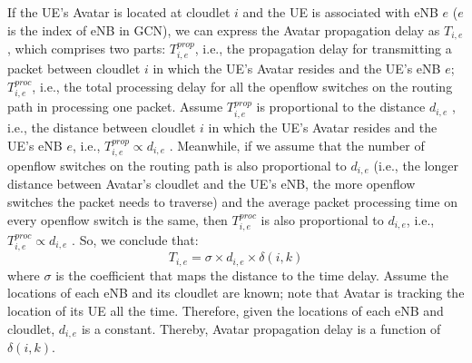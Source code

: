 \documentclass[journal,12pt,draftclsnofoot,onecolumn]{IEEEtran}
\begin{document}
	If the UE's Avatar is located at cloudlet $i$ and the UE is associated with eNB $e$ ($e$ is the index of eNB in GCN), we can express the Avatar propagation delay as $T_{i,e}$, which comprises two parts: $T_{i,e}^{prop}$, i.e., the propagation delay for transmitting a packet between cloudlet $i$ in which the UE's Avatar resides and the UE's eNB $e$; $T_{i,e}^{proc}$, i.e., the total processing delay for all the openflow switches on the routing path in processing one packet. Assume $T_{i,e}^{prop}$ is proportional to the distance $d_{i,e}$ \cite{20}, i.e., the distance between cloudlet $i$ in which the UE's Avatar resides and the UE's eNB $e$, i.e., $T_{i,e}^{prop}\propto {{d}_{i,e}}$ . Meanwhile, if we assume that the number of openflow switches on the routing path is also proportional to $d_{i,e}$ (i.e., the longer distance between Avatar's cloudlet and the UE's eNB, the more openflow switches the packet needs to traverse) and the average packet processing time on every openflow switch is the same, then $T_{i,e}^{proc}$ is also proportional to $d_{i,e}$, i.e., $T_{i,e}^{proc}\propto {{d}_{i,e}}$ . So, we conclude that:
	\begin{equation}
		{{T}_{i,e}}=\sigma \times {{d}_{i,e}}\times \delta \left( i,k \right)
	\end{equation}
	where $\sigma$ is the coefficient that maps the distance to the time delay. Assume the locations of each eNB and its cloudlet are known; note that Avatar is tracking the location of its UE all the time. Therefore, given the locations of each eNB and cloudlet, $d_{i,e}$ is a constant. Thereby, Avatar propagation delay is a function of $\delta(i,k)$.
	
	
\end{document}
